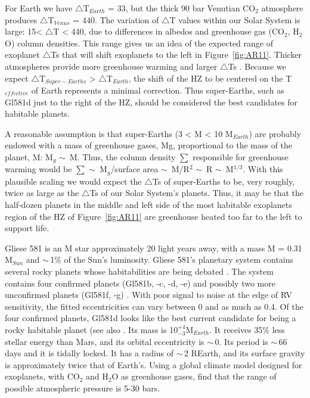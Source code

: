 For Earth we have $\bigtriangleup$T$_{Earth}$ = 33\textdegree, but the thick 90 bar Venutian CO$_{2}$ atmosphere produces $\bigtriangleup$T$_{Venus}$ = 440\textdegree. The variation of $\bigtriangleup$T values within our Solar System is large: 15\textdegree < $\bigtriangleup$T < 440\textdegree, due to differences in albedos and greenhouse gas (CO$_{2}$, H$_{2}$O) column densities. This range gives us an idea of the expected range of exoplanet $\bigtriangleup$Ts that will shift exoplanets to the left in Figure~\ref{fig:AR11}. Thicker atmospheres provide more greenhouse warming and larger $\bigtriangleup$Ts \citep{Marcus2010}. Because we expect $\bigtriangleup$T$_{Super-Earths}$ > $\bigtriangleup$T$_{Earth}$, the shift of the HZ to be centered on the T$_{effective}$ of Earth represents a minimal correction. Thus super-Earths, such as Gl581d just to the right of the HZ, should be considered the best candidates for habitable planets.

A reasonable assumption is that super-Earths (3 < M < 10 M$_{Earth}$) are probably endowed with a mass of greenhouse gases, Mg, proportional to the mass of the planet, M: M$_{g}$ $\sim$\, M. Thus, the column density $\sum$ responsible for greenhouse warming would be $\sum$ $\sim$\, M$_{g}$/surface area $\sim$\, M/R$^{2}$ $\sim$\, R $\sim$\, M$^{1/3}$. With this plausible scaling we would expect the $\bigtriangleup$Ts of super-Earths to be, very roughly, twice as large as the $\bigtriangleup$Ts of our Solar System's planets. Thus, it may be that the half-dozen planets in the middle and left side of the most habitable exoplanets region of the HZ of Figure~\ref{fig:AR11} are greenhouse heated too far to the left to support life.

Gliese 581 is an M star approximately 20 light years away, with a mass M = 0.31 M$_{Sun}$ and $\sim$\,1\% of the Sun's luminosity. Gliese 581's planetary system contains several rocky planets whose habitabilities are being debated \citep{Udry2007,Selsis2007,vonBloh2007,Mayor2009,Wordsworth2011}. The system contains four confirmed planets (Gl581b, -c, -d, -e) and possibly two more unconfirmed planets (Gl581f, -g) \citep{Vogt2010}. With poor signal to noise at the edge of RV sensitivity, the fitted eccentricities can vary between 0 and as much as 0.4. Of the four confirmed planets, Gl581d looks like the best current candidate for being a rocky habitable planet (see also \citep{Kaltenegger2011b}. Its mass is 10$^{{+}4}_{{-}3}$M$_{Earth}$. It receives 35\% less stellar energy than Mars, and its orbital eccentricity is $\sim$\,0. Its period is $\sim$\,66 days and it is tidally locked. It has a radius of $\sim$\,2 REarth, and its surface gravity is approximately twice that of Earth's. Using a global climate model designed for exoplanets, with CO$_{2}$ and H$_{2}$O as greenhouse gases, \citet{Wordsworth2011} find that the range of possible atmospheric pressure is 5-30 bars.

